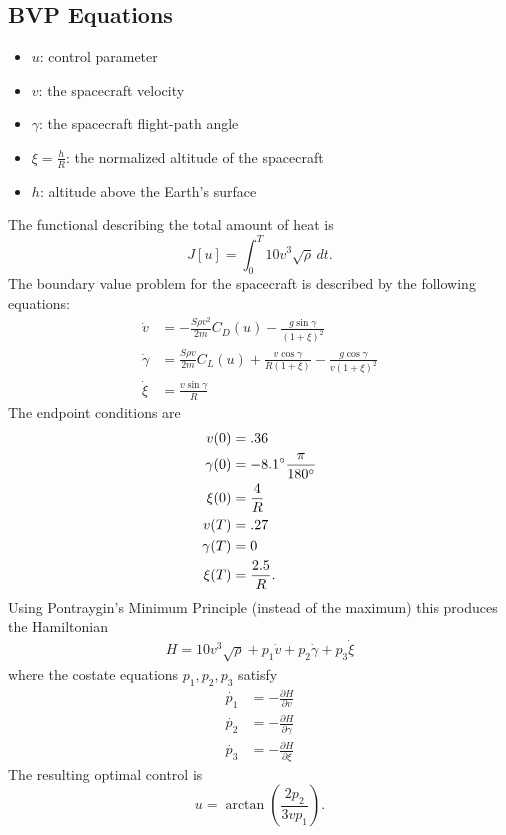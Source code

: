 \documentclass{article}
\begin{document}
\subsection*{BVP Equations}
\begin{itemize}
    \item $u$: control parameter
    \item $v$: the spacecraft velocity
    \item $\gamma$: the spacecraft flight-path angle
    \item $\xi = \frac{h}{R}$: the normalized altitude of the spacecraft
    \item $h$: altitude above the Earth's surface
\end{itemize}

The functional describing the total amount of heat is
\[
J[u] = \int_0^T 10v^3 \sqrt{\rho}\,dt
.\]
The boundary value problem for the spacecraft is described by the following equations:
\begin{align*}
    \dot{v} &= -\frac{S \rho v^2}{2m}C_D(u) - \frac{g \sin{\gamma}}{(1 + \xi)^2} \\
    \dot{\gamma} &= \frac{S \rho v}{2m}C_L(u) + \frac{v\cos{\gamma}}{R(1 + \xi)} - \frac{g\cos{\gamma}}{v(1+\xi)^2} \\
    \dot{\xi} &= \frac{v\sin{\gamma}}{R}
\end{align*}
The endpoint conditions are
\begin{align*}
    v(0) &= .36 \\
    \gamma{(0)} &= -8.1\degree \frac{\pi}{180\degree} \\
    \xi(0) &= \frac{4}{R} \\
    v(T) &= .27 \\
    \gamma(T) &= 0 \\
    \xi(T) &= \frac{2.5}{R}.
\end{align*}
Using Pontraygin's Minimum Principle (instead of the maximum) this produces the Hamiltonian
\begin{align*}
    H = 10v^3 \sqrt{\rho} + p_1\dot{v} + p_2\dot{\gamma} + p_3\dot{\xi}
\end{align*}
where the costate equations $p_1, p_2, p_3$ satisfy
\begin{align*}
    \dot{p_1} &= -\frac{\partial H}{\partial v} \\
    \dot{p_2} &= -\frac{\partial H}{\partial \gamma} \\
    \dot{p_3} &= -\frac{\partial H}{\partial \xi}
\end{align*}
The resulting optimal control is
\[
u = \arctan(\frac{2p_2}{3vp_1}).
\]
\end{document}
